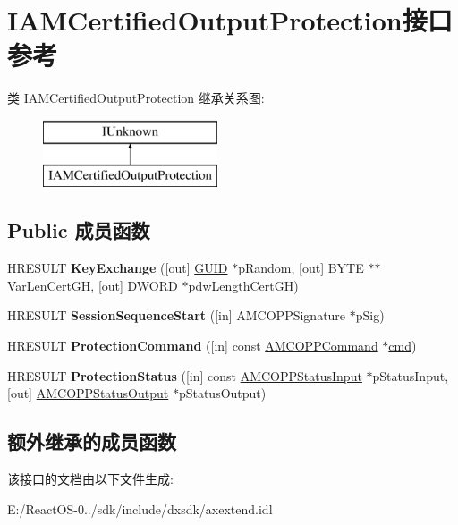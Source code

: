 \hypertarget{interface_i_a_m_certified_output_protection}{}\section{I\+A\+M\+Certified\+Output\+Protection接口 参考}
\label{interface_i_a_m_certified_output_protection}
类 I\+A\+M\+Certified\+Output\+Protection 继承关系图\+:\begin{figure}[H]
\begin{center}
\leavevmode
\includegraphics[height=2.000000cm]{interface_i_a_m_certified_output_protection}
\end{center}
\end{figure}
\subsection*{Public 成员函数}
\begin{DoxyCompactItemize}
\item 
\mbox{\label{interface_i_a_m_certified_output_protection_ac0dea4d6a5fa351c92c01e726b05efa8}} 
H\+R\+E\+S\+U\+LT {\bfseries Key\+Exchange} (\mbox{[}out\mbox{]} \hyperlink{interface_g_u_i_d}{G\+U\+ID} $\ast$p\+Random, \mbox{[}out\mbox{]} B\+Y\+TE $\ast$$\ast$Var\+Len\+Cert\+GH, \mbox{[}out\mbox{]} D\+W\+O\+RD $\ast$pdw\+Length\+Cert\+GH)
\item 
\mbox{\label{interface_i_a_m_certified_output_protection_ac5495a6ce0f0b32ef4c152772512ceee}} 
H\+R\+E\+S\+U\+LT {\bfseries Session\+Sequence\+Start} (\mbox{[}in\mbox{]} A\+M\+C\+O\+P\+P\+Signature $\ast$p\+Sig)
\item 
\mbox{\label{interface_i_a_m_certified_output_protection_a86b3593f66388add5d8a17e10ff70b99}} 
H\+R\+E\+S\+U\+LT {\bfseries Protection\+Command} (\mbox{[}in\mbox{]} const \hyperlink{struct___a_m_c_o_p_p_command}{A\+M\+C\+O\+P\+P\+Command} $\ast$\hyperlink{structcmd}{cmd})
\item 
\mbox{\label{interface_i_a_m_certified_output_protection_a899251cdc4aa843e8a1b1c5a83108070}} 
H\+R\+E\+S\+U\+LT {\bfseries Protection\+Status} (\mbox{[}in\mbox{]} const \hyperlink{struct___a_m_c_o_p_p_status_input}{A\+M\+C\+O\+P\+P\+Status\+Input} $\ast$p\+Status\+Input, \mbox{[}out\mbox{]} \hyperlink{struct___a_m_c_o_p_p_status_output}{A\+M\+C\+O\+P\+P\+Status\+Output} $\ast$p\+Status\+Output)
\end{DoxyCompactItemize}
\subsection*{额外继承的成员函数}


该接口的文档由以下文件生成\+:\begin{DoxyCompactItemize}
\item 
E\+:/\+React\+O\+S-\/0../sdk/include/dxsdk/axextend.\+idl\end{DoxyCompactItemize}
